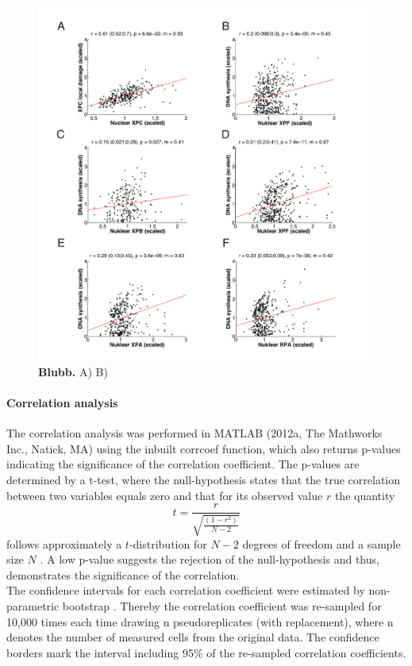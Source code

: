 \begin{figure}[htbp]
	\begin{center}
		\includegraphics[width=1\textwidth]{Abbildungen/figure3_3.pdf}
		\caption{\textbf{Blubb.} A) B) }
		\label{fig:Nuc_vs_DNAsynthesis}
	\end{center}
\end{figure}
\paragraph{Correlation analysis}
The correlation analysis was performed in MATLAB (2012a, The Mathworks Inc., Natick, MA) using the inbuilt corrcoef function, which also returns p-values indicating the significance of the correlation coefficient. The p-values are determined by a t-test, where the null-hypothesis states that the true correlation between two variables equals zero and that for its observed value $r$ the quantity 
\begin{equation}
	t = \frac{r}{\sqrt{\frac{(1-r^2)}{N-2}}}
\end{equation}     
follows approximately a $t$-distribution for $N-2$ degrees of freedom and a sample size $N$ \cite{Kendall1979,Fisher1958}. A low p-value suggests the rejection of the null-hypothesis and thus, demonstrates the significance of the correlation.\\
The confidence intervals for each correlation coefficient were estimated by non-parametric bootstrap \cite{Efron1979}. Thereby the correlation coefficient was re-sampled for 10,000 times each time drawing n pseudoreplicates (with replacement), where n denotes the number of measured cells from the original data. The confidence borders mark the interval including 95\% of the re-sampled correlation coefficients.         




